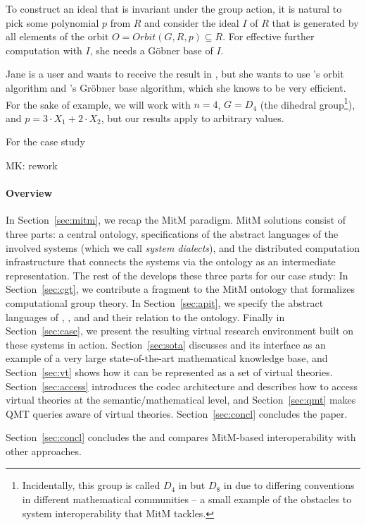 To construct an ideal that is invariant
under the group action, it is natural to pick some polynomial $p$ from $R$
and consider the ideal $I$ of $R$ that is generated by all elements of the orbit
$O=Orbit(G,R,p)\subseteq R$.
For effective further computation with $I$, she needs a G\"obner base of $I$.

Jane is a \Sage user and wants to receive the result in \Sage, but she wants to
use \GAP's orbit algorithm and \Singular's Gr\"obner base algorithm, which she
knows to be very efficient. For the sake of example, we will work with $n=4$,
$G=D_4$ (the dihedral group\footnote{Incidentally, this group is called $D_4$ in
\Sage but $D_8$ in \GAP due to differing conventions in different mathematical
communities -- a small example of the obstacles to system interoperability that
MitM tackles.}), and $p=3\cdot X_1+2\cdot X_2$, but our results apply to
arbitrary values.

For the \LMFDB case study

\begin{newpart}{MK: rework}
\paragraph{Overview}
In Section~\ref{sec:mitm}, we recap the MitM paradigm.  MitM solutions consist of three
parts: a central ontology, specifications of the abstract languages of the involved
systems (which we call \emph{system dialects}), and the distributed computation
infrastructure that connects the systems via the ontology as an intermediate
representation.  The rest of the \papertype develops these three parts for our case study:
In Section~\ref{sec:cgt}, we contribute a fragment to the MitM ontology that formalizes
computational group theory.  In Section~\ref{sec:apit}, we specify the abstract languages
of \GAP, \Sage, and \Singular and their relation to the ontology.  Finally in
Section~\ref{sec:case}, we present the resulting virtual research environment built on
these systems in action. Section~\ref{sec:sota} discusses \lmfdb and its interface as an
example of a very large state-of-the-art mathematical knowledge base, and
Section~\ref{sec:vt} shows how it can be represented as a set of virtual theories.
Section~\ref{sec:access} introduces the codec architecture and describes how to access
virtual theories at the semantic/mathematical level, and Section~\ref{sec:qmt} makes QMT
queries aware of virtual theories.  Section~\ref{sec:concl} concludes the paper.


Section~\ref{sec:concl} concludes the \papertype and compares MitM-based interoperability with other approaches.
\end{newpart}


